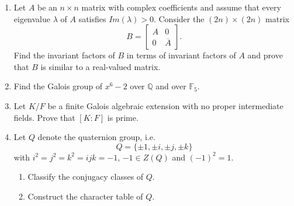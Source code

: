 \documentclass[11pt,letterpaper]{report}
\newcommand{\rationals}{\mathbb{Q}}
\newcommand{\field}{\mathbb{F}}
\begin{document}
\begin{enumerate}
	\item Let $A$ be an $n\times n$ matrix with complex coefficients and assume that every eigenvalue $\lambda$ of $A$ satisfies $Im(\lambda)>0$. Consider the $(2n)\times (2n)$ matrix
	\[
	B = \begin{bmatrix}
		A & 0\\
		0 & \overline{A}
	\end{bmatrix}.
	\]
	Find the invariant factors of $B$ in terms of invariant factors of $A$ and prove that $B$ is similar to a real-valued matrix.
	\vfill
	\item Find the Galois group of $x^6-2$ over $\rationals$ and over $\field_5$.
	\vfill
	\item Let $K/F$ be a finite Galois algebraic extension with no proper intermediate fields. Prove that $[K:F]$ is prime.
	\vfill
	\item Let $Q$ denote the quaternion group, i.e.
	\[
	Q = \{\pm 1, \pm i, \pm j, \pm k\}
	\]
	with $i^2 = j^2= k^2 = ijk = -1$, $-1\in Z(Q)$ and $(-1)^2 = 1$.
	\begin{enumerate}
		\item Classify the conjugacy classes of $Q$.
		\item Construct the character table of $Q$.
	\end{enumerate}
	\vfill
\end{enumerate}
\end{document}

